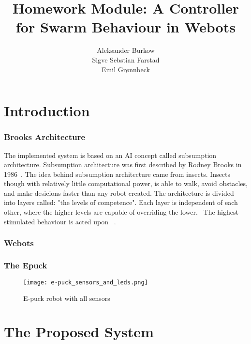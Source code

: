 \documentclass[a4paper]{article}
\title{Homework Module: A Controller for Swarm Behaviour in Webots}
\author{
    Aleksander Burkow \\
    Sigve Sebstian Farstad \\
    Emil Grønnbeck
}
\begin{document}
\maketitle
\thispagestyle{empty}


\newpage

\setcounter{page}{1}

\part{Introduction}

\section{Brooks Architecture}
The implemented system is based on an AI concept called subsumption architecture.
Subsumption architecture was first described by Rodney Brooks in 1986~\cite{brooks}.
The idea behind subsumption architecture came from insects.
Insects though with relatively little computational power, is able to walk, avoid obstacles, and make desicions faster than any robot created.
The architecture is divided into layers called: "the levels of competence".
Each layer is  independent of each other, where the higher levels are capable of overriding the lower.~\cite{mwarnerwu}
The highest stimulated behaviour is acted upon ~\cite{berg-karud}.

\section{Webots}
\section{The Epuck}

\begin{figure}[H]
\centering
\texttt{[image: e-puck\_sensors\_and\_leds.png]}
\caption{E-puck robot with all sensors}
\end{figure}

\part{The Proposed System}
\end{document}
